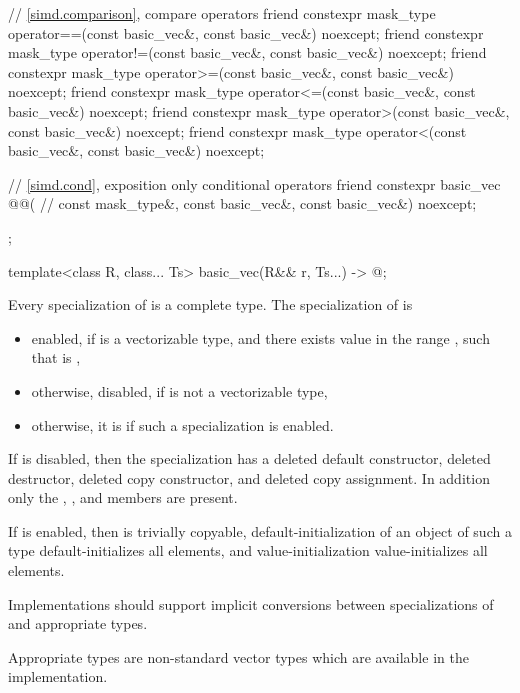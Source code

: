 \begin{codeblock}
{{    // \ref{simd.comparison},  compare operators
    friend constexpr mask_type operator==(const basic_vec&, const basic_vec&) noexcept;
    friend constexpr mask_type operator!=(const basic_vec&, const basic_vec&) noexcept;
    friend constexpr mask_type operator>=(const basic_vec&, const basic_vec&) noexcept;
    friend constexpr mask_type operator<=(const basic_vec&, const basic_vec&) noexcept;
    friend constexpr mask_type operator>(const basic_vec&, const basic_vec&) noexcept;
    friend constexpr mask_type operator<(const basic_vec&, const basic_vec&) noexcept;

    // \ref{simd.cond},  exposition only conditional operators
    friend constexpr basic_vec @@( // \expos
      const mask_type&, const basic_vec&, const basic_vec&) noexcept;
  };

  template<class R, class... Ts>
    basic_vec(R&& r, Ts...) -> @\seebelow@;
}
\end{codeblock}

\pnum
Every specialization of  is a complete type.
The specialization of  is
\begin{itemize}
 \item
    enabled, if  is a vectorizable type, and there exists value
     in the range , such that  is
    ,
 \item
   otherwise, disabled, if  is not a vectorizable type,
 \item
   otherwise, it is  if such a specialization is enabled.
\end{itemize}

If  is disabled, then the specialization has a
deleted default constructor, deleted destructor, deleted copy constructor, and
deleted copy assignment.
In addition only the , , and
 members are present.

If  is enabled, then  is
trivially copyable, default-initialization of an object of such a type
default-initializes all elements, and value-initialization value-initializes
all elements.

\pnum
\recommended
Implementations should support implicit conversions between specializations of
 and appropriate  types.
\begin{note}
Appropriate types are non-standard vector types which are available in the
implementation.
\end{note}

